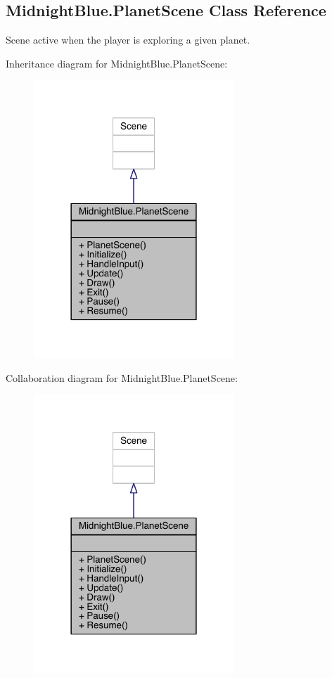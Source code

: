 \hypertarget{class_midnight_blue_1_1_planet_scene}{}\subsection{Midnight\+Blue.\+Planet\+Scene Class Reference}
\label{class_midnight_blue_1_1_planet_scene}


Scene active when the player is exploring a given planet.  




Inheritance diagram for Midnight\+Blue.\+Planet\+Scene\+:\nopagebreak
\begin{figure}[H]
\begin{center}
\leavevmode
\includegraphics[width=213pt]{class_midnight_blue_1_1_planet_scene__inherit__graph}
\end{center}
\end{figure}


Collaboration diagram for Midnight\+Blue.\+Planet\+Scene\+:\nopagebreak
\begin{figure}[H]
\begin{center}
\leavevmode
\includegraphics[width=213pt]{class_midnight_blue_1_1_planet_scene__coll__graph}
\end{center}
\end{figure}
